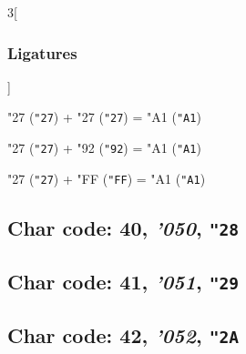 \documentclass{article}
\newlength{\maxcharwidth}
\begin{document}
\begin{multicols}{3}[\subsubsection{Ligatures}]

{\testfont\char"27\noboundary} ({\tt"27}) + {\testfont\char"27\noboundary} ({\tt"27}) = {\testfont\char"A1\noboundary} ({\tt"A1}) 

{\testfont\char"27\noboundary} ({\tt"27}) + {\testfont\char"92\noboundary} ({\tt"92}) = {\testfont\char"A1\noboundary} ({\tt"A1}) 

{\testfont\char"27\noboundary} ({\tt"27}) + {\testfont\char"FF\noboundary} ({\tt"FF}) = {\testfont\char"A1\noboundary} ({\tt"A1}) 

\end{multicols}

\subsection{Char code: 40, {\it'050}, {\tt"28}}
\label{char_40}


\subsection{Char code: 41, {\it'051}, {\tt"29}}
\label{char_41}


\subsection{Char code: 42, {\it'052}, {\tt"2A}}
\label{char_42}

\end{document}

